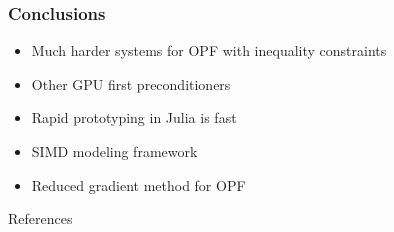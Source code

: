 \begin{frame}
  \frametitle{Conclusions}
  \begin{itemize}
    \item Much harder systems for OPF with inequality constraints
    \item Other GPU first preconditioners
    \item Rapid prototyping in Julia is fast
    \item SIMD modeling framework
    \item Reduced gradient method for OPF
  \end{itemize}
\end{frame}

\begin{frame}{References}
    \printbibliography[heading=none]
\end{frame}



